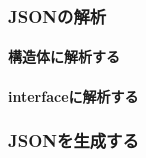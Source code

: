 
\subsubsection{JSONの解析}
\paragraph{構造体に解析する}

\paragraph{interfaceに解析する}

\subsubsection{JSONを生成する}

